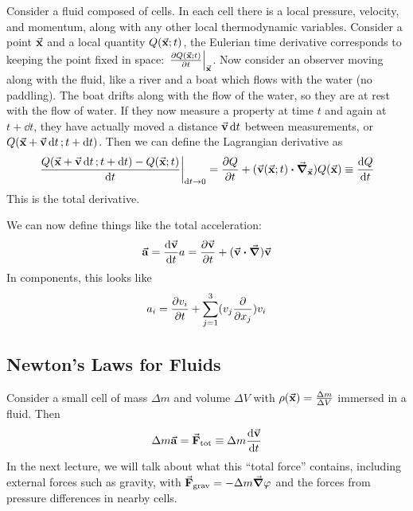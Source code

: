 \documentclass[a4paper,twoside,master.tex]{subfiles}
\begin{document}
Consider a fluid composed of cells. In each cell there is a local pressure, velocity, and momentum, along with any other local thermodynamic variables. Consider a point $ \va{x} $ and a local quantity $ Q(\va{x};t) $, the Eulerian time derivative corresponds to keeping the point fixed in space: $ \eval{\pdv{Q(\va{x};t)}{t}}_{\va{x}} $. Now consider an observer moving along with the fluid, like a river and a boat which flows with the water (no paddling). The boat drifts along with the flow of the water, so they are at rest with the flow of water. If they now measure a property at time $ t $ and again at $ t + \dd{t} $, they have actually moved a distance $ \va{v} \dd{t} $ between measurements, or $ Q(\va{x} + \va{v} \dd{t};t + \dd{t}) $. Then we can define the Lagrangian derivative as
\begin{equation}
    \eval{\frac{Q(\va{x} + \va{v} \dd{t};t + \dd{t}) - Q(\va{x};t)}{\dd{t}}}_{\dd{t} \to 0} = \pdv{Q}{t} + (\va{v}(\va{x};t) \vdot \grad_{\va{x}})Q(\va{x}) \equiv \dv{Q}{t}
\end{equation}
This is the total derivative.

We can now define things like the total acceleration:
\begin{equation}
    \va{a} = \dv{\va{v}}{t}a = \pdv{\va{v}}{t} + (\va{v} \vdot \grad) \va{v}
\end{equation}
In components, this looks like
\begin{equation}
    a_i = \pdv{v_i}{t} + \sum_{j=1}^{3} (v_j \pdv{x_j}) v_i
\end{equation}

\subsection{Newton's Laws for Fluids}\label{sub:newton's_laws_for_fluids}

Consider a small cell of mass $ \Delta m $ and volume $ \Delta V $ with $ \rho(\va{x}) = \frac{\Delta m}{\Delta V} $ immersed in a fluid. Then
\begin{equation}
    \Delta m \va{a} = \va{F}_{\text{tot}} \equiv \Delta m \dv{\va{v}}{t}
\end{equation}
In the next lecture, we will talk about what this ``total force'' contains, including external forces such as gravity, with $ \va{F}_{\text{grav}} = - \Delta m \grad{\varphi} $ and the forces from pressure differences in nearby cells.
\end{document}
